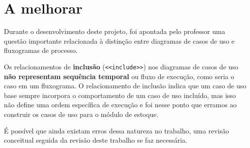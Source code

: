 \documentclass[12pt,a4paper]{article}
\begin{document}
\newpage
\section{A melhorar}


Durante o desenvolvimento deste projeto, foi apontada pelo professor uma questão importante relacionada à distinção entre diagramas de casos de uso e fluxogramas de processo. 

Os relacionamentos de \textbf{inclusão} (\texttt{<<include>>}) nos diagramas de casos de uso \textbf{não representam sequência temporal} ou fluxo de execução, como seria o caso em um fluxograma. O relacionamento de inclusão indica que um caso de uso base sempre incorpora o comportamento de um caso de uso incluído, mas isso não define uma ordem específica de execução e foi nesse ponto que erramos ao construir os casos de uso para o módulo de estoque. 

É possível que ainda existam erros dessa natureza no trabalho, uma revisão conceitual seguida da revisão deste trabalho se faz necessária.
\end{document}

